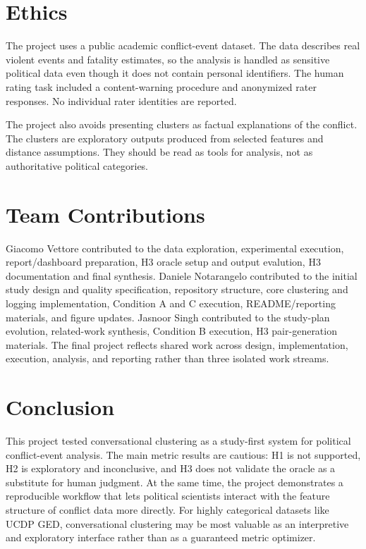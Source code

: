 \documentclass[11pt,a4paper]{article}
\begin{document}
\section{Ethics}

The project uses a public academic conflict-event dataset. The data describes real violent events and fatality estimates, so the analysis is handled as sensitive political data even though it does not contain personal identifiers. The human rating task included a content-warning procedure and anonymized rater responses. No individual rater identities are reported.

The project also avoids presenting clusters as factual explanations of the conflict. The clusters are exploratory outputs produced from selected features and distance assumptions. They should be read as tools for analysis, not as authoritative political categories.

\section{Team Contributions}

Giacomo Vettore contributed to the data exploration, experimental execution, report/dashboard preparation, H3 oracle setup and output evalution, H3 documentation and final synthesis. Daniele Notarangelo contributed to the initial study design and quality specification, repository structure, core clustering and logging implementation, Condition A and C execution, README/reporting materials, and figure updates. Jasnoor Singh contributed to the study-plan evolution, related-work synthesis, Condition B execution, H3 pair-generation materials. The final project reflects shared work across design, implementation, execution, analysis, and reporting rather than three isolated work streams.

\section{Conclusion}

This project tested conversational clustering as a study-first system for political conflict-event analysis. The main metric results are cautious: H1 is not supported, H2 is exploratory and inconclusive, and H3 does not validate the oracle as a substitute for human judgment. At the same time, the project demonstrates a reproducible workflow that lets political scientists interact with the feature structure of conflict data more directly. For highly categorical datasets like UCDP GED, conversational clustering may be most valuable as an interpretive and exploratory interface rather than as a guaranteed metric optimizer.
\end{document}
